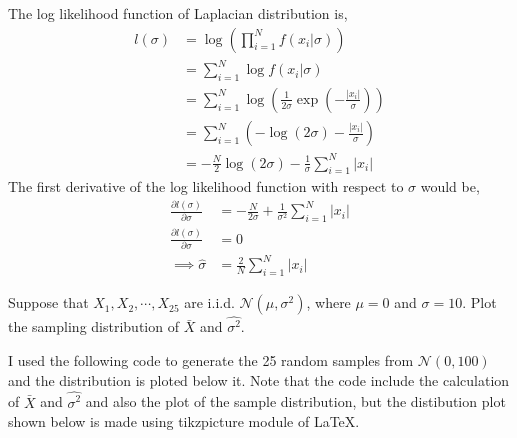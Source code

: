 \documentclass[addpoints]{exam}
\theoremstyle{mytheoremstyle}
\theoremstyle{mytheoremstyle}
\theoremstyle{myproblemstyle}
\begin{document}
\begin{questions}
\begin{parts}
        \begin{solution}
            The log likelihood function of Laplacian distribution is,
            \begin{align*}
                l(\sigma) & =\log \left(\prod_{i=1}^{N} f(x_{i}|\sigma)\right)                                            \\
                          & =\sum_{i=1}^{N} \log f(x_{i}|\sigma)                                                          \\
                          & =\sum_{i=1}^{N} \log \left(\frac{1}{2\sigma}\exp{\left(-\frac{|x_{i}|}{\sigma}\right)}\right) \\
                          & =\sum_{i=1}^{N} \left(-\log{(2\sigma)}-\frac{|x_{i}|}{\sigma}\right)                          \\
                          & =-\frac{N}{2}\log{(2\sigma)}-\frac{1}{\sigma}\sum_{i=1}^{N}|x_{i}|
            \end{align*}
            The first derivative of the log likelihood function with respect to \(\sigma\) would be,
            \begin{align*}
                \frac{\partial l(\sigma)}{\partial \sigma} & =-\frac{N}{2\sigma}+\frac{1}{\sigma^{2}}\sum_{i=1}^{N}|x_{i}| \\
                \frac{\partial l(\sigma)}{\partial \sigma} & =0                                                            \\
                \implies \hat{\sigma}                      & =\frac{2}{N}\sum_{i=1}^{N}|x_{i}|
            \end{align*}
        \end{solution}
    \end{parts}


    \question Suppose that \(X_{1},X_{2},\cdots,X_{25}\) are i.i.d. \(\mathcal{N}(\mu,\sigma^{2})\), where \(\mu=0\) and \(\sigma=10\). Plot the sampling distribution of \(\bar{X}\) and \(\hat{\sigma^{2}}\).

    \begin{solution}
        I used the following code to generate the 25 random samples from \(\mathcal{N}(0,100)\) and the distribution is ploted below it. Note that the code include the calculation of \(\bar{X}\) and \(\hat{\sigma^{2}}\) and also the plot of the sample distribution, but the distibution plot shown below is made using tikzpicture module of \LaTeX.
        



\end{solution}
\end{questions}
\end{document}
